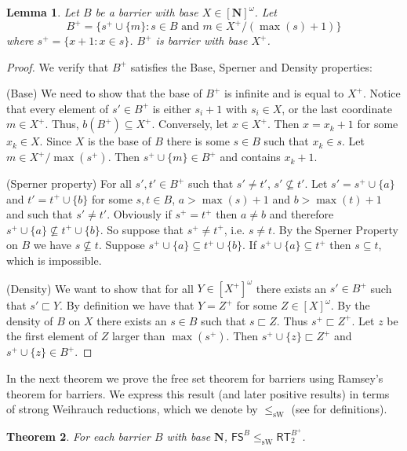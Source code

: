 \documentclass{amsart}
\theoremstyle{plain}
\theoremstyle{plain}
\newtheorem{theorem}{Theorem}
\newtheorem{lemma}[theorem]{Lemma}
\newcommand{\om}{\omega}
\newcommand\Nat{\mathbf{N}}
\newcommand\RT{\mathsf{RT}}
\newcommand\FS{\mathsf{FS}}
\newcommand\sW{\mathrm{sW}}
\begin{document}
\begin{lemma}
    Let $B$ be a barrier with base $X\in [\Nat]^\om$. Let 
    $$B^+ = \{ s^+ \cup\{m\}  :  s \in B \text{ and } m \in X^+/(\max(s)+1)\}$$ 
     where $s^+ = \{x+1: x\in s\}$. $B^+$ is barrier with base $X^+$.
\end{lemma}
\begin{proof}
    We verify that $B^+$ satisfies the Base, Sperner and Density properties:
    
(Base) We need to show that the base of $B^+$ is infinite and is equal to $X^+$. Notice that every element of $s'\in B^+$ is either $s_i+1$ with $s_i\in X$, or the last coordinate $m\in X^+$. Thus, $b(B^+)\subseteq X^+$. Conversely, let $x \in X^+$. Then $x= x_k+1$ for some $x_k \in X$. Since $X$ is the base of $B$ there is some $s\in B$ such that $x_k \in s$. Let $m \in X^+/\max(s^+)$. Then $s^+ \cup \{m\} \in B^+$ and contains $x_k+1$. 

(Sperner property) For all $s', t' \in B^+$ such that $s'\neq t'$, $s' \not\subseteq t'$. Let $s' = s^+ \cup \{ a\}$ and 
$t' = t^+ \cup \{ b\}$ for some $s, t \in B$, $a > \max(s)+1$ and $b > \max(t) +1$ and such that $s' \neq t'$. Obviously if 
$s^+ = t^+$ then $a \neq b$ and therefore  $s^+ \cup \{ a\} \not\subseteq t^+ \cup \{ b\}$. So suppose that $s^+ \neq t^+$, i.e.
$s \neq t$. By the Sperner Property on $B$ we have $s \not\subseteq t$. Suppose $s^+ \cup \{ a\} \subseteq t^+ \cup \{ b\}$.
If $s^+ \cup \{ a \} \subseteq t^+$ then $s \subseteq t$, which is impossible. 

(Density) We want to show that for all $Y \in [X^+]^\om$ there exists an $s' \in B^+$ such that $s'\sqsubset Y$.
By definition we have that $Y = Z^+$ for some $Z \in [X]^\om$. By the density of $B$ on $X$
there exists an $s \in B$ such that $s \sqsubset Z$. Thus $s^+ \sqsubset Z^+$. Let $z$ be the first 
element of $Z$ larger than $\max(s^+)$. Then $s^+ \cup \{z\} \sqsubset Z^+$ and $s^+ \cup \{z\}\in B^+$. 
 \end{proof}

In the next theorem we prove the free set theorem for barriers using Ramsey's theorem for barriers. We express this result (and later positive results) in terms of strong Weihrauch reductions, which we denote by $\leq_\sW$ (see \cite{Dzhafarov.Mummert2022} for definitions). 

\begin{theorem}\label{thm:fs_red_rt}
For each barrier $B$ with base $\Nat$, $\FS^B\leq_{\sW} \RT^{B^+}_2$. 
\end{theorem}
\end{document}
